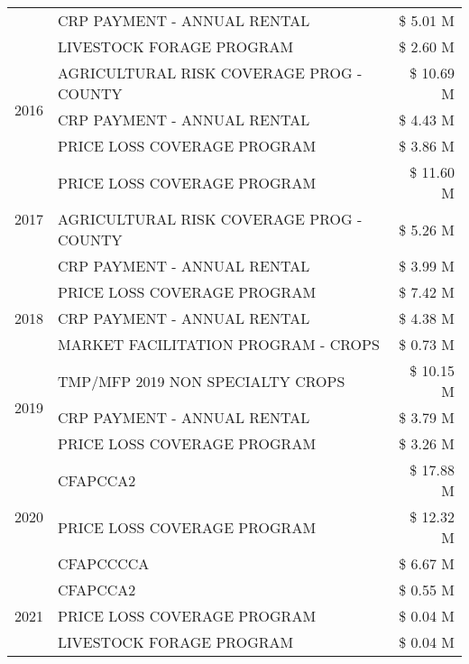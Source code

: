 \begin{tabular}{llr}
 & CRP PAYMENT - ANNUAL RENTAL & \$ 5.01 M \\
 & LIVESTOCK FORAGE PROGRAM & \$ 2.60 M \\
\cline{1-3}
\multirow[t]{3}{*}{2016} & AGRICULTURAL RISK COVERAGE PROG - COUNTY      & \$ 10.69 M \\
 & CRP PAYMENT - ANNUAL RENTAL                   & \$ 4.43 M \\
 & PRICE LOSS COVERAGE PROGRAM                   & \$ 3.86 M \\
\cline{1-3}
\multirow[t]{3}{*}{2017} & PRICE LOSS COVERAGE PROGRAM & \$ 11.60 M \\
 & AGRICULTURAL RISK COVERAGE PROG - COUNTY & \$ 5.26 M \\
 & CRP PAYMENT - ANNUAL RENTAL & \$ 3.99 M \\
\cline{1-3}
\multirow[t]{3}{*}{2018} & PRICE LOSS COVERAGE PROGRAM & \$ 7.42 M \\
 & CRP PAYMENT - ANNUAL RENTAL & \$ 4.38 M \\
 & MARKET FACILITATION PROGRAM - CROPS & \$ 0.73 M \\
\cline{1-3}
\multirow[t]{3}{*}{2019} & TMP/MFP 2019 NON SPECIALTY CROPS & \$ 10.15 M \\
 & CRP PAYMENT - ANNUAL RENTAL & \$ 3.79 M \\
 & PRICE LOSS COVERAGE PROGRAM & \$ 3.26 M \\
\cline{1-3}
\multirow[t]{3}{*}{2020} & CFAPCCA2 & \$ 17.88 M \\
 & PRICE LOSS COVERAGE PROGRAM & \$ 12.32 M \\
 & CFAPCCCCA & \$ 6.67 M \\
\cline{1-3}
\multirow[t]{3}{*}{2021} & CFAPCCA2 & \$ 0.55 M \\
 & PRICE LOSS COVERAGE PROGRAM & \$ 0.04 M \\
 & LIVESTOCK FORAGE PROGRAM & \$ 0.04 M \\
\cline{1-3}
\bottomrule
\end{tabular}
